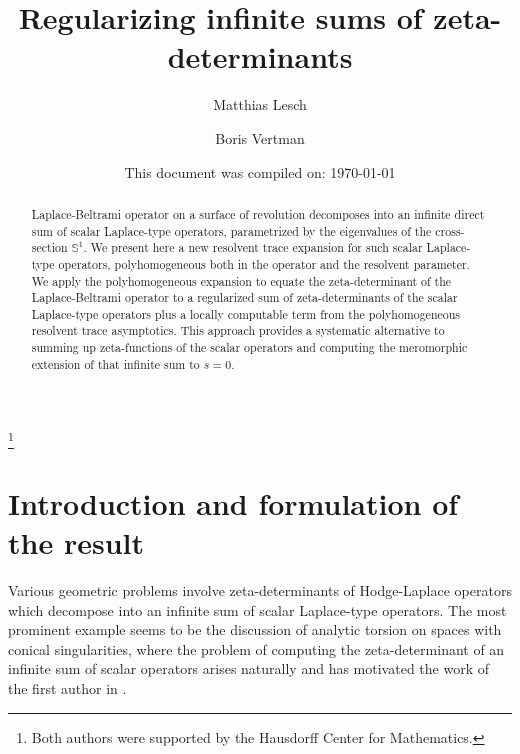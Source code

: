 

\title[Regularizing infinite sums of zeta-determinants]
{Regularizing infinite sums of zeta-determinants}

\author{Matthias Lesch}
\address{Mathematisches Institut,
Universit\"at Bonn,
Endenicher Allee 60,
53115 Bonn,
Germany}


\author{Boris Vertman}
\address{Mathematisches Institut,
Universit\"at Bonn,
Endenicher Allee 60,
53115 Bonn,
Germany}

\thanks{Both authors were supported by the 
        Hausdorff Center for Mathematics.}

\date{This document was compiled on: \today}


\begin{abstract}
Laplace-Beltrami operator on a surface of revolution decomposes into an infinite direct sum 
of scalar Laplace-type operators, parametrized by the eigenvalues of the cross-section $\mathbb{S}^1$. 
We present here a new resolvent trace expansion for such scalar Laplace-type operators, 
polyhomogeneous both in the operator and the resolvent parameter. 
We apply the polyhomogeneous expansion to equate the zeta-determinant of the 
Laplace-Beltrami operator to a regularized sum of zeta-determinants of the scalar 
Laplace-type operators plus a locally computable term from the polyhomogeneous 
resolvent trace asymptotics. 
This approach provides a systematic alternative to summing up zeta-functions of the scalar operators 
and computing the meromorphic extension of that infinite sum to $s=0$. 
\end{abstract}

\maketitle
\tableofcontents


\section{Introduction and formulation of the result}
Various geometric problems involve zeta-determinants of Hodge-Laplace operators 
which decompose into an infinite sum of scalar Laplace-type operators. The most prominent 
example seems to be the discussion of analytic torsion on spaces with conical singularities, where the problem 
of computing the zeta-determinant of an infinite sum of scalar operators arises naturally and has 
motivated the work of the first author in \cite{Les:DOR}. 

